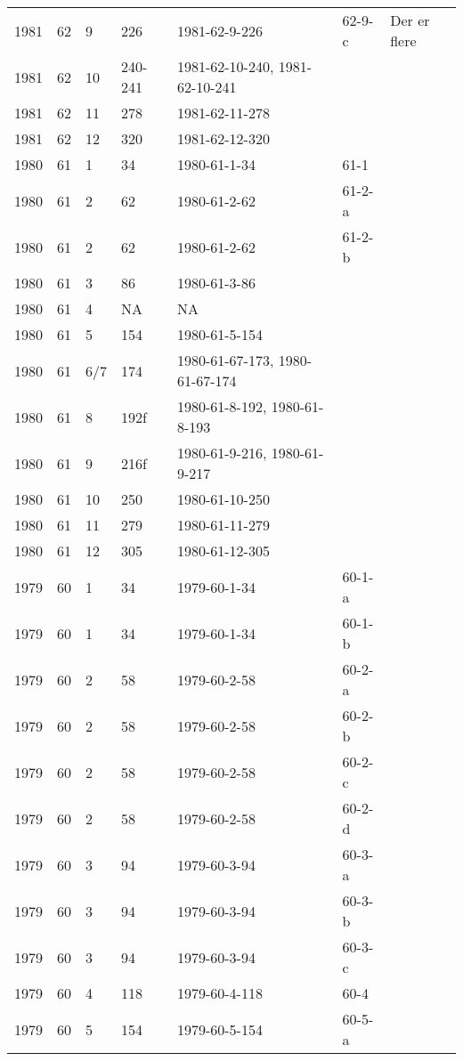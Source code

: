 \begin{longtable}{ |l|l|l|l|p{2.7cm}|l|p{2cm}| }
 1981 & 62 &     9 &     226 &  1981-62-9-226 &  62-9-c & Der er flere \\
 1981 & 62 &    10 & 240-241 & 1981-62-10-240, 1981-62-10-241 &  & \\
 1981 & 62 &    11 &     278 & 1981-62-11-278 &  & \\
 1981 & 62 &    12 &     320 & 1981-62-12-320 &  & \\
 1980 & 61 &     1 &      34 &   1980-61-1-34 & 61-1 & \\
 1980 & 61 &     2 &      62 &   1980-61-2-62 & 61-2-a & \\
 1980 & 61 &     2 &      62 &   1980-61-2-62 & 61-2-b & \\
 1980 & 61 &     3 &      86 &   1980-61-3-86 &  & \\
 1980 & 61 &     4 &      NA &    NA          &  & \\
 1980 & 61 &     5 &     154 & 1980-61-5-154  &  & \\
 1980 & 61 &   6/7 &     174 & 1980-61-67-173, 1980-61-67-174 &  & \\
 1980 & 61 &     8 &    192f & 1980-61-8-192, 1980-61-8-193 &  & \\
 1980 & 61 &     9 &    216f & 1980-61-9-216, 1980-61-9-217 &  & \\
 1980 & 61 &    10 &     250 & 1980-61-10-250 &  & \\
 1980 & 61 &    11 &     279 & 1980-61-11-279 &  & \\
 1980 & 61 &    12 &     305 & 1980-61-12-305 &  & \\
 1979 & 60 &     1 &      34 & 1979-60-1-34   & 60-1-a & \\
 1979 & 60 &     1 &      34 & 1979-60-1-34   & 60-1-b & \\
 1979 & 60 &     2 &      58 & 1979-60-2-58   & 60-2-a & \\
 1979 & 60 &     2 &      58 & 1979-60-2-58   & 60-2-b & \\
 1979 & 60 &     2 &      58 & 1979-60-2-58   & 60-2-c & \\
 1979 & 60 &     2 &      58 & 1979-60-2-58   & 60-2-d & \\
 1979 & 60 &     3 &      94 & 1979-60-3-94   & 60-3-a & \\
 1979 & 60 &     3 &      94 & 1979-60-3-94   & 60-3-b & \\
 1979 & 60 &     3 &      94 & 1979-60-3-94   & 60-3-c & \\
 1979 & 60 &     4 &     118 & 1979-60-4-118  & 60-4 & \\
 1979 & 60 &     5 &     154 & 1979-60-5-154  & 60-5-a & \\

\end{longtable}
